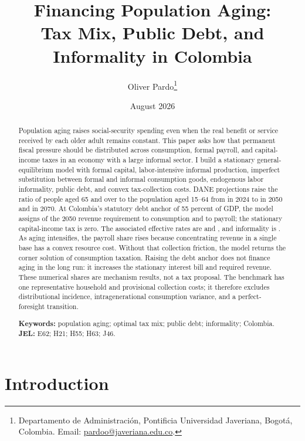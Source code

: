 \documentclass[12pt]{article}
\title{\textbf{Financing Population Aging:}\\
\large Tax Mix, Public Debt, and Informality in Colombia}
\author{
  Oliver Pardo\thanks{
    Departamento de Administraci{\'o}n, Pontificia Universidad Javeriana,
    Bogot{\'a}, Colombia.
    Email: \href{mailto:pardoo@javeriana.edu.co}{pardoo@javeriana.edu.co}.
  }
}
\date{August 2026}
\begin{document}
\maketitle

\begin{abstract}\small\sloppy
\noindent
Population aging raises social-security spending even when the real benefit
or service received by each older adult remains constant. This paper asks how
that permanent fiscal pressure should be distributed across consumption,
formal payroll, and capital-income taxes in an economy with a large informal
sector. I build a stationary general-equilibrium model with formal capital,
labor-intensive informal production, imperfect substitution between formal
and informal consumption goods, endogenous labor informality, public debt,
and convex tax-collection costs. DANE projections raise the ratio of people
aged 65 and over to the population aged 15--64 from
\DependencyTwentyTwentyFour{} in 2024 to \DependencyTwentyFifty{} in 2050
and \DependencyTwentySeventy{} in 2070. At Colombia's statutory debt anchor
of 55 percent of GDP, the model assigns \OptimalConsumptionShareTwentyFifty{}
of the 2050 revenue requirement to consumption and
\OptimalPayrollShareTwentyFifty{} to payroll; the stationary capital-income
tax is zero. The associated effective rates are
\OptimalConsumptionTaxTwentyFifty{} and \OptimalPayrollTaxTwentyFifty{},
and informality is \OptimalInformalityTwentyFifty{}. As aging intensifies,
the payroll share rises because concentrating revenue in a single base has a
convex resource cost. Without that collection friction, the model returns the
corner solution of \FrictionlessConsumptionShare{} consumption taxation.
Raising the debt anchor does not finance aging in the long run: it increases
the stationary interest bill and required revenue. These numerical shares are
mechanism results, not a tax proposal. The benchmark has one representative
household and provisional collection costs; it therefore excludes
distributional incidence, intragenerational consumption variance, and a
perfect-foresight transition.

\medskip\noindent
\textbf{Keywords:} population aging; optimal tax mix; public debt;
informality; Colombia.
\quad
\textbf{JEL:} E62; H21; H55; H63; J46.
\end{abstract}\fussy

\section{Introduction}
\end{document}
